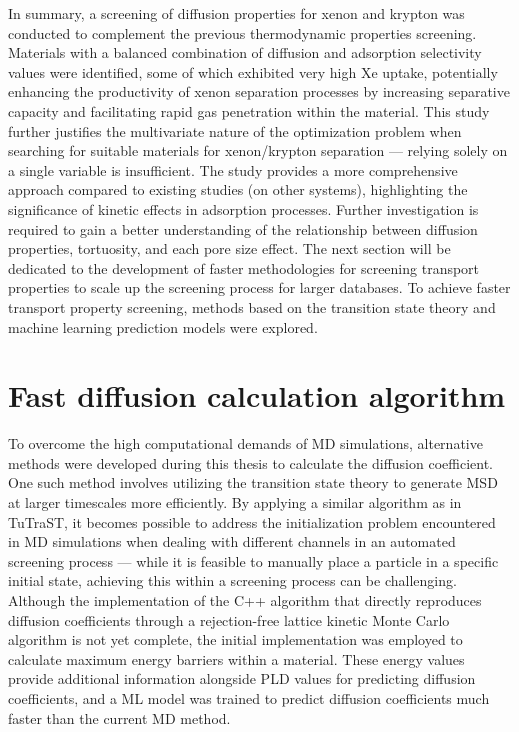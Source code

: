 \documentclass[main]{subfiles}
\begin{document}
In summary, a screening of diffusion properties for xenon and krypton was conducted to complement the previous thermodynamic properties screening. Materials with a balanced combination of diffusion and adsorption selectivity values were identified, some of which exhibited very high Xe uptake, potentially enhancing the productivity of xenon separation processes by increasing separative capacity and facilitating rapid gas penetration within the material. This study further justifies the multivariate nature of the optimization problem when searching for suitable materials for xenon/krypton separation --- relying solely on a single variable is insufficient. The study provides a more comprehensive approach compared to existing studies (on other systems), highlighting the significance of kinetic effects in adsorption processes.\autocite{Stanton_2022} Further investigation is required to gain a better understanding of the relationship between diffusion properties, tortuosity, and each pore size effect. The next section will be dedicated to the development of faster methodologies for screening transport properties to scale up the screening process for larger databases. To achieve faster transport property screening, methods based on the transition state theory and machine learning prediction models were explored.

\section{Fast diffusion calculation algorithm}\label{sct:algo_diff}

To overcome the high computational demands of MD simulations, alternative methods were developed during this thesis to calculate the diffusion coefficient. One such method involves utilizing the transition state theory to generate MSD at larger timescales more efficiently. By applying a similar algorithm as in TuTraST, it becomes possible to address the initialization problem encountered in MD simulations when dealing with different channels in an automated screening process --- while it is feasible to manually place a particle in a specific initial state, achieving this within a screening process can be challenging. Although the implementation of the C++ algorithm that directly reproduces diffusion coefficients through a rejection-free lattice kinetic Monte Carlo algorithm is not yet complete, the initial implementation was employed to calculate maximum energy barriers within a material. These energy values provide additional information alongside PLD values for predicting diffusion coefficients, and a ML model was trained to predict diffusion coefficients much faster than the current MD method.
\end{document}
